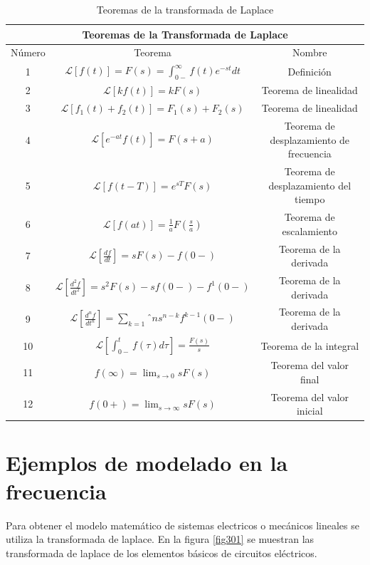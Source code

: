 \documentclass[12pt]{book}
\theoremstyle{definition}
\theoremstyle{remark}
\theoremstyle{plain}
\begin{document}
\begin{table}[!hbt]
\begin{center}
\begin{tabular}{|c|c|c|}
\hline
\multicolumn{3}{|c|}{Teoremas de la Transformada de Laplace}\\
\hline
Número & Teorema & Nombre \\
\hline
\hline
1 & $\mathcal{L} [f(t)] = F(s) = \int_{0-}^{\infty}f(t) e^{-s t}d t $ & Definición\\
\hline
2 &$ \mathcal{L} [k f(t)]  = k F(s) $ & Teorema de linealidad \\
\hline
3 & $\mathcal{L} [ f_1 (t)+ f_2 (t)] = F_1 (s) + F_2 (s)$ & Teorema de linealidad \\
\hline
4 & $\mathcal{L} [e^{-a t} f(t)]  = F(s+a) $& Teorema de desplazamiento de frecuencia \\
\hline
5 & $\mathcal{L} [f(t-T)]  = e^{s T} F(s)$ & Teorema de desplazamiento del tiempo \\
\hline
6 & $\mathcal{L} [f(a t)]  = \frac{1}{a} F(\frac{s}{a}) $ & Teorema de escalamiento \\
\hline
7 & $\mathcal{L} [\frac{d f}{d t}]  = s F(s)- f(0-)$ & Teorema de la derivada \\
\hline
8 & $\mathcal{L} [\frac{d ^2 f}{d t^2}]  = s^2 F(s) - s f(0-)-f^1(0-)$ & Teorema de la derivada \\
\hline
9 & $\mathcal{L} [\frac{d ^n f}{d t^n}]  = \sum_{k=1}ˆn s^{n-k} f^{k-1}(0-)$ & Teorema de la derivada \\
\hline
10 & $\mathcal{L} [\int_{0-}^t f(\tau) d \tau ]  = \frac{F(s)}{s} $ & Teorema de la integral \\
\hline
11 & $f(\infty)  = \lim_{s \to 0} s F(s)$ & Teorema del valor final \\
\hline
12 & $f(0+)  = \lim_{s \to \infty} s F(s)$ & Teorema del valor inicial \\
\hline
\end{tabular}
\end{center}
\caption{Teoremas de la transformada de Laplace}
\label{tab2}
\end{table}

\section{Ejemplos de modelado en la frecuencia}
Para obtener el modelo matemático de sistemas electricos o mecánicos lineales se utiliza la transformada de laplace. En la figura \ref{fig301} se muestran las transformada de laplace de los elementos básicos de circuitos eléctricos. 
\end{document}
